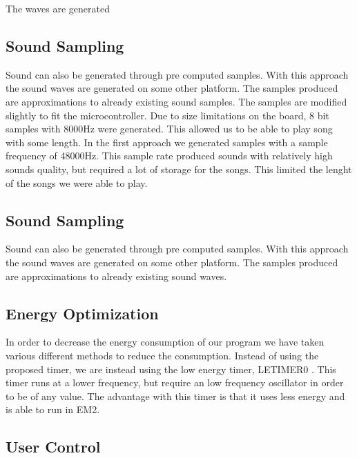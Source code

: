 The waves are generated  

\subsection{Sound Sampling}
Sound can also be generated through pre computed samples. With this approach the sound waves are generated on some other platform. The samples produced are approximations to already existing sound samples. The samples are modified slightly to fit the microcontroller. Due to size limitations on the board, 8 bit samples with 8000Hz were generated. This allowed us to be able to play song with some length. In the first approach we generated samples with a sample frequency of 48000Hz. This sample rate produced sounds with relatively high sounds quality, but required a lot of storage for the songs. This limited the lenght of the songs we were able to play. 

\subsection{Sound Sampling}
Sound can also be generated through pre computed samples. With this approach the sound waves are generated on some other platform. The samples produced are approximations to already existing sound waves.


\subsection{Energy Optimization}
In order to decrease the energy consumption of our program we have taken various different methods to reduce the consumption. Instead of using the proposed timer\cite{compendium}, we are instead using the low energy timer, LETIMER0 \cite{EFM32GG-rm}. This timer runs at a lower frequency, but require an low frequency oscillator in order to be of any value. The advantage with this timer is that it uses less energy and is able to run in EM2.  



\subsection{User Control}












